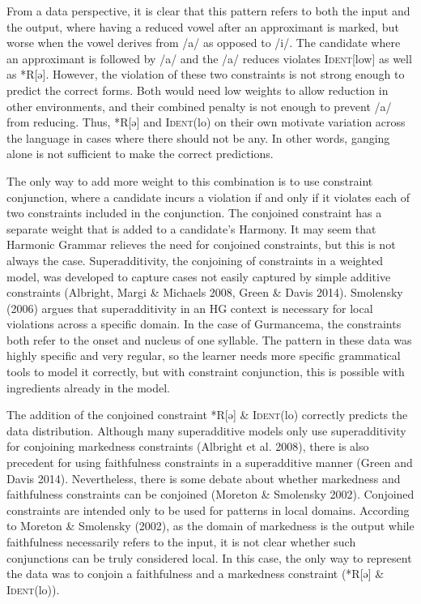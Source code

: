 \documentclass[output=paper,
modfonts
]{langscibook}
\begin{document}
From a data perspective, it is clear that this pattern refers to both the input and the output, where having a reduced vowel after an approximant is marked, but worse when the vowel derives from /a/ as opposed to /i/. The candidate where an approximant is followed by /a/ and the /a/ reduces violates \textsc{Ident}[low] as well as *R[ə]. However, the violation of these two constraints is not strong enough to predict the correct forms. Both would need low weights to allow reduction in other environments, and their combined penalty is not enough to prevent /a/ from reducing. Thus, *R[ə] and \textsc{Ident}(lo) on their own motivate variation across the language in cases where there should not be any. In other words, ganging alone is not sufficient to make the correct predictions. 
	
The only way to add more weight to this combination is to use constraint conjunction, where a candidate incurs a violation if and only if it violates each of two constraints included in the conjunction. The conjoined constraint has a separate weight that is added to a candidate’s Harmony. It may seem that Harmonic Grammar relieves the need for conjoined constraints, but this is not always the case. Superadditivity, the conjoining of constraints in a weighted model, was developed to capture cases not easily captured by simple additive constraints (Albright, Margi \& Michaels 2008, Green \& Davis 2014). Smolensky (2006) argues that superadditivity in an HG context is necessary for local violations across a specific domain. In the case of Gurmancema, the constraints both refer to the onset and nucleus of one syllable. The pattern in these data was highly specific and very regular, so the learner needs more specific grammatical tools to model it correctly, but with constraint conjunction, this is possible with ingredients already in the model. 

The addition of the conjoined constraint *R[ə] \& \textsc{Ident}(lo) correctly predicts the data distribution. Although many superadditive models only use superadditivity for conjoining markedness constraints (Albright et al. 2008), there is also precedent for using faithfulness constraints in a superadditive manner (Green and Davis 2014). Nevertheless, there is some debate about whether markedness and faithfulness constraints can be conjoined (Moreton \& Smolensky 2002). Conjoined constraints are intended only to be used for patterns in local domains. According to Moreton \& Smolensky (2002), as the domain of markedness is the output while faithfulness necessarily refers to the input, it is not clear whether such conjunctions can be truly considered local. In this case, the only way to represent the data was to conjoin a faithfulness and a markedness constraint (*R[ə] \& \textsc{Ident}(lo)). 
\end{document}
